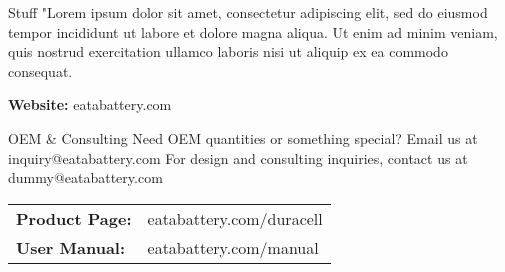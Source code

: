 \documentclass{labelFourBySix}
\makeatletter
\renewcommand\email{dummy@eatabattery.com}
\renewcommand\website{eatabattery.com}
\makeatother
\begin{document}
\begin{backLabel}
\begin{page}
	\begin{infoBox}{Stuff}
	"Lorem ipsum dolor sit amet, consectetur adipiscing elit, sed do eiusmod tempor incididunt ut labore et dolore magna aliqua. Ut enim ad minim veniam, quis nostrud exercitation ullamco laboris nisi ut aliquip ex ea commodo consequat.

	\textbf{Website: }\website
	\end{infoBox}\vspace{-6pt}

	\begin{infoBox}{OEM \& Consulting}
	Need OEM quantities or something special?  Email us at inquiry@\website
	For design and consulting inquiries, contact us at \email
	\end{infoBox}\vspace{-6pt}
	\begin{infoBox}{}
		\begin{tabular}{l l}
		\textbf{Product Page:} &\website/duracell\\
		\textbf{User Manual:} &\website/manual\\
		\end{tabular}
	\end{infoBox}\vspace{-6pt}

	\makeContactInfo
	\end{page}
	\end{backLabel}
\end{document}
